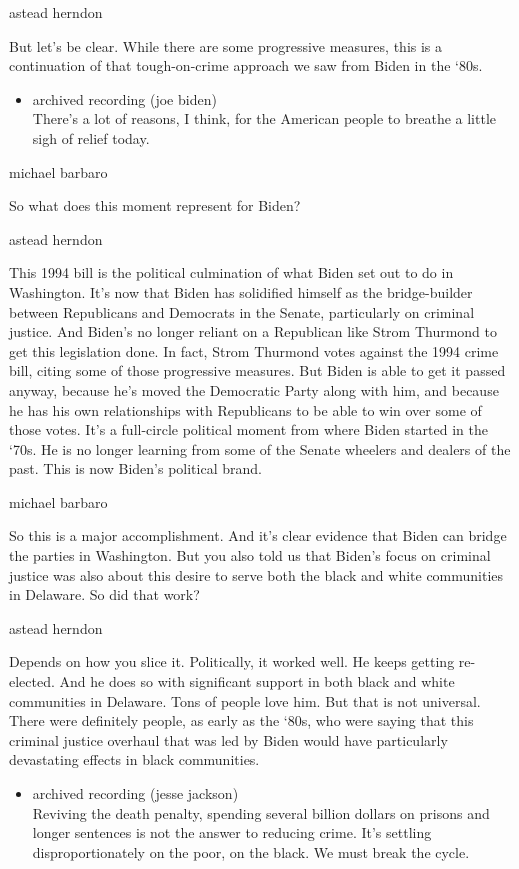 astead herndon

But let's be clear. While there are some progressive measures, this is a
continuation of that tough-on-crime approach we saw from Biden in the
`80s.

\begin{itemize}
\tightlist
\item
  archived recording (joe biden)\\
  There's a lot of reasons, I think, for the American people to breathe
  a little sigh of relief today.
\end{itemize}

michael barbaro

So what does this moment represent for Biden?

astead herndon

This 1994 bill is the political culmination of what Biden set out to do
in Washington. It's now that Biden has solidified himself as the
bridge-builder between Republicans and Democrats in the Senate,
particularly on criminal justice. And Biden's no longer reliant on a
Republican like Strom Thurmond to get this legislation done. In fact,
Strom Thurmond votes against the 1994 crime bill, citing some of those
progressive measures. But Biden is able to get it passed anyway, because
he's moved the Democratic Party along with him, and because he has his
own relationships with Republicans to be able to win over some of those
votes. It's a full-circle political moment from where Biden started in
the `70s. He is no longer learning from some of the Senate wheelers and
dealers of the past. This is now Biden's political brand.

michael barbaro

So this is a major accomplishment. And it's clear evidence that Biden
can bridge the parties in Washington. But you also told us that Biden's
focus on criminal justice was also about this desire to serve both the
black and white communities in Delaware. So did that work?

astead herndon

Depends on how you slice it. Politically, it worked well. He keeps
getting re-elected. And he does so with significant support in both
black and white communities in Delaware. Tons of people love him. But
that is not universal. There were definitely people, as early as the
`80s, who were saying that this criminal justice overhaul that was led
by Biden would have particularly devastating effects in black
communities.

\begin{itemize}
\tightlist
\item
  archived recording (jesse jackson)\\
  Reviving the death penalty, spending several billion dollars on
  prisons and longer sentences is not the answer to reducing crime. It's
  settling disproportionately on the poor, on the black. We must break
  the cycle.
\end{itemize}


